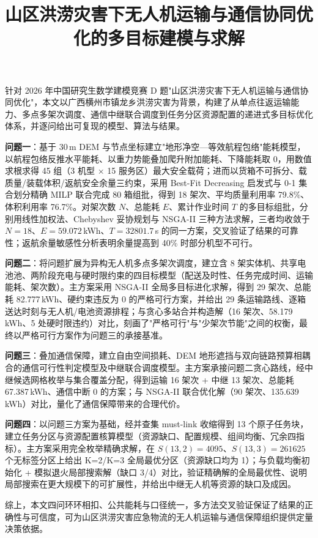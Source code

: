 \documentclass[bwprint]{gmcmthesis}
\title{山区洪涝灾害下无人机运输与通信协同优化的多目标建模与求解}
\makeatletter
\renewenvironment{abstract}{%
  \if@twocolumn\section*{\gmcm@cap@abstractname}%
  \else\begin{center}{\zihao{4}\bfseries \gmcm@cap@abstractname\vspace{-.5em}\vspace{\z@}}\end{center}\quotation
  \fi}{\if@twocolumn\else\endquotation\fi}
\makeatother
\begin{document}
\maketitle

\begin{abstract}

针对 2026 年中国研究生数学建模竞赛 D 题"山区洪涝灾害下无人机运输与通信协同优化"，本文以广西横州市镇龙乡洪涝灾害为背景，构建了从单点往返运输能力、多点多架次调度、通信中继联合调度到任务分区资源配置的递进式多目标优化体系，并逐问给出可复现的模型、算法与结果。

\textbf{问题一}：基于 30\,m DEM 与节点坐标建立"地形净空—等效航程包络"能耗模型，以航程包络反推水平能耗、以重力势能叠加爬升附加能耗、下降能耗取 0，用数值求根求得 45 组（3 机型 $\times$ 15 服务区）最大安全载荷；进而以货箱不可拆分、载质量/装载体积/返航安全余量三约束，采用 Best-Fit Decreasing 启发式与 0-1 集合划分精确 MILP 联合完成 80 箱组批，得到 18 架次、平均质量利用率 79.8\%、体积利用率 76.7\%。对架次数 $N$、总能耗 $E$、累计作业时间 $T$ 的多目标组批，分别用线性加权法、Chebyshev 妥协规划与 NSGA-II 三种方法求解，三者均收敛于 $N=18$、$E=59.072$\,kWh、$T=32801.7$\,s 的同一方案，交叉验证了结果的可靠性；返航余量敏感性分析表明余量提高到 40\% 时部分机型不可行。

\textbf{问题二}：将问题扩展为异构无人机多点多架次调度，建立含 8 架实体机、共享电池池、两阶段充电与硬时限约束的四目标模型（配送及时性、任务完成时间、运输能耗、架次数）。主方案采用 NSGA-II 全局多目标进化求解，得到 29 架次、总能耗 82.777\,kWh、硬约束违反为 0 的严格可行方案，并给出 29 条运输路线、逐箱送达时刻与无人机/电池资源排程；与贪心多站合并构造解（16 架次、58.179\,kWh、5 处硬时限违约）对比，刻画了"严格可行"与"少架次节能"之间的权衡，最终以严格可行方案作为问题三的承接基准。

\textbf{问题三}：叠加通信保障，建立自由空间损耗、DEM 地形遮挡与双向链路预算相耦合的通信可行性判定模型及中继联合调度模型。主方案承接问题二贪心路线，经中继候选网格枚举与集合覆盖分配，得到运输 16 架次 + 中继 13 架次、总能耗 67.387\,kWh、通信中断 0 的方案；与 NSGA-II 联合优化解（90 架次、135.639\,kWh）对比，量化了通信保障带来的合理代价。

\textbf{问题四}：以问题三方案为基础，经并查集 must-link 收缩得到 13 个原子任务块，建立任务分区与资源配置核算模型（资源缺口、配置规模、组间均衡、冗余四指标）。主方案采用完全枚举精确求解，在 $S(13,2)=4095$、$S(13,3)=261625$ 个无标签分区上给出 K=2/K=3 全局最优分区（资源缺口均为 1）；与负载均衡初始化 + 模拟退火局部搜索解（缺口 3/4）对比，验证精确解的全局最优性、说明局部搜索在更大规模下的可扩展性，并给出中继无人机等资源的缺口及成因。

综上，本文四问环环相扣、公共能耗与口径统一，多方法交叉验证保证了结果的正确性与可信度，可为山区洪涝灾害应急物流的无人机运输与通信保障组织提供定量决策依据。

\end{abstract}
\end{document}
